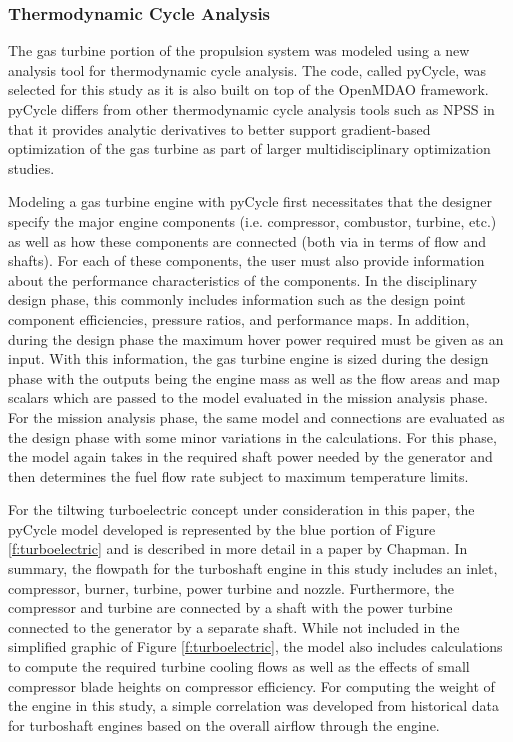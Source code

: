 \subsubsection{Thermodynamic Cycle Analysis} %
The gas turbine portion of the propulsion system was modeled using a new analysis tool for thermodynamic cycle analysis.
The code, called pyCycle\cite{gray2017chemical,hearn2016optimization}, was selected for this study as it is also built on top of the OpenMDAO framework.
pyCycle differs from other thermodynamic cycle analysis tools such as NPSS in that it provides analytic derivatives to better support gradient-based optimization of the gas turbine as part of larger multidisciplinary optimization studies.


Modeling a gas turbine engine with pyCycle first necessitates that the designer specify the major engine components (i.e. compressor, combustor, turbine, etc.) as well as how these components are connected (both via in terms of flow and shafts).
For each of these components, the user must also provide information about the performance characteristics of the components.
In the disciplinary design phase, this commonly includes information such as the design point component efficiencies, pressure ratios, and performance maps.
In addition, during the design phase the maximum hover power required must be given as an input.
With this information, the gas turbine engine is sized during the design phase with the outputs being the engine mass as well as the flow areas and map scalars which are passed to the model evaluated in the mission analysis phase.
For the mission analysis phase, the same model and connections are evaluated as the design phase with some minor variations in the calculations.  
For this phase, the model again takes in the required shaft power needed by the generator and then determines the fuel flow rate subject to maximum temperature limits.

For the tiltwing turboelectric concept under consideration in this paper, the pyCycle model developed is represented by the blue portion of Figure \ref{f:turboelectric} and is described in more detail in a paper by Chapman.\cite{chapman2018multi}
In summary, the flowpath for the turboshaft engine in this study includes an inlet, compressor, burner, turbine, power turbine and nozzle. 
Furthermore, the compressor and turbine are connected by a shaft with the power turbine connected to the generator by a separate shaft. 
While not included in the simplified graphic of Figure \ref{f:turboelectric}, the model also includes calculations to compute the required turbine cooling flows as well as the effects of small compressor blade heights on compressor efficiency.
For computing the weight of the engine in this study, a simple correlation was developed from historical data for turboshaft engines based on the overall airflow through the engine.
